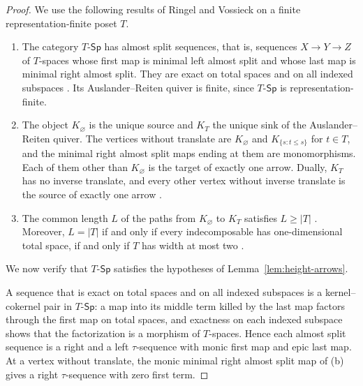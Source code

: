\documentclass[a4paper,reqno,10pt]{amsart}
\theoremstyle{definition}
\numberwithin{equation}{section}
\newcommand{\TSp}{T\text{-}\mathsf{Sp}}
\begin{document}
\begin{proof}
We use the following results of Ringel and Vossieck on a finite
representation-finite poset \(T\).
\begin{enumerate}[label={\upshape(\alph*)}]
\item The category \(\TSp\) has almost split sequences, that is,
sequences \(X\to Y\to Z\) of \(T\)-spaces whose first map is minimal left
almost split and whose last map is minimal right almost split. They are
exact on total spaces and on all indexed subspaces
\cite[Section~1, p.~219, and Section~7, p.~234]{RV}.
Its Auslander--Reiten quiver is finite, since \(\TSp\) is
representation-finite.
\item The object \(K_\varnothing\) is the unique source and \(K_T\) the
unique sink of the Auslander--Reiten quiver. The vertices without
translate are \(K_\varnothing\) and \(K_{\{s:t\leq s\}}\) for
\(t\in T\), and the minimal right almost split maps ending at them are
monomorphisms. Each of them other than \(K_\varnothing\) is the target of
exactly one arrow. Dually, \(K_T\) has no inverse translate, and every
other vertex without inverse translate is the source of exactly one arrow
\cite[Section~7, pp.~234--235]{RV}.
\item The common length \(L\) of the paths from \(K_\varnothing\) to
\(K_T\) satisfies \(L\geq|T|\) \cite[Section~8, p.~237]{RV}. Moreover,
\(L=|T|\) if and only if every indecomposable has one-dimensional total
space, if and only if \(T\) has width at most two
\cite[Section~8, Proposition, p.~237]{RV}.
\end{enumerate}
We now verify that \(\TSp\) satisfies the hypotheses of
Lemma~\ref{lem:height-arrows}.

A sequence that is
exact on total spaces and on all indexed subspaces is a kernel--cokernel
pair in \(\TSp\): a map into its middle term killed by the last map factors
through the first map on total spaces, and exactness on each indexed
subspace shows that the factorization is a morphism of \(T\)-spaces. Hence
each almost split sequence is a right and a left \(\tau\)-sequence with
monic first map and epic last map. At a vertex without translate, the
monic minimal right almost split map of (b) gives a right
\(\tau\)-sequence with zero first term.


\end{proof}
\end{document}
